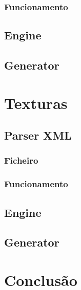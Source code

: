 \documentclass[a4paper]{article}
\begin{document}
\subsubsection{Funcionamento}
\label{sec:funcionamentoi}

\subsection{Engine}
\label{sec:enginei}

\subsection{Generator}
\label{sec:generatori}

\section{Texturas}
\label{sec:texturas}

\subsection{Parser XML}
\label{sec:parsert}

\subsubsection{Ficheiro}
\label{sec:ficheirot}

\subsubsection{Funcionamento}
\label{sec:funcionamentot}

\subsection{Engine}
\label{sec:enginet}

\subsection{Generator}
\label{sec:generatort}

\section{Conclusão}
\label{sec:conclusao}
\end{document}
